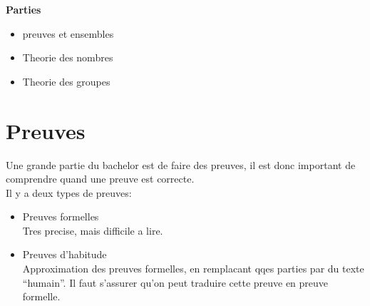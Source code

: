 \documentclass[../main.tex]{subfiles}
\begin{document}
\begin{center}
	\textbf{Parties}
\end{center}

\begin{itemize}
	\item preuves et ensembles\\
	\item Theorie des nombres\\
	\item Theorie des groupes	
\end{itemize}
\chapter{Preuves}

Une grande partie du bachelor est de faire des preuves, il est donc important de comprendre quand une preuve est correcte.\\

Il y a deux types de preuves:
\begin{itemize}
	\item Preuves formelles\\
		Tres precise, mais difficile a lire.\\
	\item Preuves d'habitude\\
		Approximation des preuves formelles, en remplacant qqes parties par du texte ``humain''.
		Il faut s'assurer qu'on peut traduire cette preuve en preuve formelle.
\end{itemize}
\end{document}
